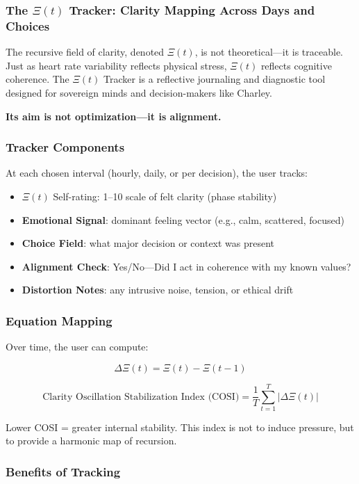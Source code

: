 \documentclass[12pt]{article}
\begin{document}
\subsubsection*{The $\Xi(t)$ Tracker: Clarity Mapping Across Days and Choices}

The recursive field of clarity, denoted $\Xi(t)$, is not theoretical—it is traceable. Just as heart rate variability reflects physical stress, $\Xi(t)$ reflects cognitive coherence. The $\Xi(t)$ Tracker is a reflective journaling and diagnostic tool designed for sovereign minds and decision-makers like Charley.

\textbf{Its aim is not optimization—it is alignment.}

\subsubsection*{Tracker Components}

At each chosen interval (hourly, daily, or per decision), the user tracks:

\begin{itemize}
    \item $\Xi(t)$ Self-rating: 1–10 scale of felt clarity (phase stability)
    \item \textbf{Emotional Signal}: dominant feeling vector (e.g., calm, scattered, focused)
    \item \textbf{Choice Field}: what major decision or context was present
    \item \textbf{Alignment Check}: Yes/No—Did I act in coherence with my known values?
    \item \textbf{Distortion Notes}: any intrusive noise, tension, or ethical drift
\end{itemize}

\subsubsection*{Equation Mapping}

Over time, the user can compute:

\[
\Delta \Xi(t) = \Xi(t) - \Xi(t-1)
\]

\[
\text{Clarity Oscillation Stabilization Index (COSI)} = \frac{1}{T} \sum_{t=1}^{T} |\Delta \Xi(t)|
\]

Lower COSI = greater internal stability. This index is not to induce pressure, but to provide a harmonic map of recursion.

\subsubsection*{Benefits of Tracking}
\end{document}
